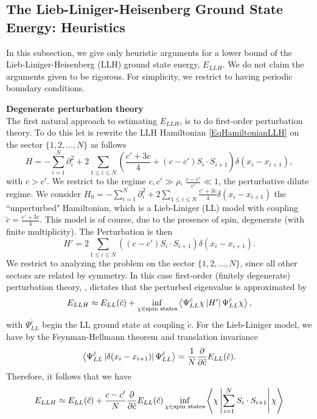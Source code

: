 \subsection{The Lieb-Liniger-Heisenberg Ground State Energy: Heuristics}
In this subsection, we give only heuristic arguments for a lower bound of the Lieb-Liniger-Heisenberg (LLH) ground state energy, $ E_{LLH} $. We do not claim the arguments given to be rigorous. For simplicity, we restrict to having periodic boundary conditions. 

\textbf{Degenerate perturbation theory}\\
The first natural approach to estimating $ E_{LLH} $, is to do first-order perturbation theory. To do this let is rewrite the LLH Hamiltonian \eqref{EqHamiltonianLLH} on the sector $ \{1,2,\ldots,N\} $ as follows\begin{equation}
H=-\sum_{i=1}^{N}\partial_i^2+2\sum_{1\leq i\leq N} \left(\frac{c'+3c}{4}+(c-c')S_i\cdot S_{i+1}\right)\delta(x_i-x_{i+1}),
\end{equation}
with $ c>c' $. We restrict to the regime $ c,c'\gg \rho $, $ \frac{c-c'}{c'}\ll 1 $, \ie the perturbative dilute regime.
We consider $ H_0=-\sum_{i=1}^{N}\partial_i^2+2\sum_{1\leq i\leq N} \frac{c'+3c}{4}\delta(x_i-x_{i+1}) $ the ``unperturbed" Hamiltonian, which is a Lieb-Liniger (LL) model with coupling $ \tilde{c}=\frac{c'+3c}{4} $. This model is of course, due to the presence of spin, degenerate (with finite multiplicity). The Perturbation is then 
$$ H'=2\sum_{1\leq i\leq N} \left((c-c')S_i\cdot S_{i+1}\right)\delta(x_i-x_{i+1}). $$
We restrict to analyzing the problem on the sector $ \{1,2,\ldots,N\} $, since all other sectors are related by symmetry.
In this case first-order (finitely degenerate) perturbation theory, \cite{reed1978iv}, dictates that the perturbed eigenvalue is approximated by \begin{equation}
E_{LLH}\approx E_{LL}(\tilde{c})+\inf_{\chi\in\text{spin states}}\left\langle\Psi^{\tilde{c}}_{LL}\chi\left\vert H'\right\vert \Psi^{\tilde{c}}_{LL}\chi\right\rangle,
\end{equation}
with $ \Psi_{LL}^{\tilde{c}} $ begin the LL ground state at coupling $ \tilde{c} $. For the Lieb-Liniger model, we have by the Feynman-Hellmann theorem and translation invariance \begin{equation}
\left\langle\Psi^{\tilde{c}}_{LL}\left\vert\delta(x_i-x_{i+1})\right\vert \Psi^{\tilde{c}}_{LL}\right\rangle=\frac{1}{N}\frac{\partial}{\partial \tilde{c}}E_{LL}(\tilde{c}).
\end{equation}
Therefore, it follows that we have \begin{equation}
E_{LLH}\approx E_{LL}(\tilde{c})+\frac{c-c'}{N}\frac{\partial}{\partial \tilde{c}}E_{LL}(\tilde{c})\inf_{\chi\in\text{spin states}}\left\langle\chi\left\vert \sum_{i=1}^{N}S_i\cdot S_{i+1}\right\vert \chi\right\rangle
\end{equation}
